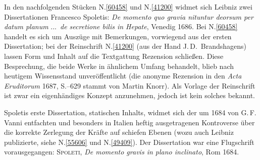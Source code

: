\begin{ledgroup}
\footnotesize
\pstart
\noindent
In den nachfolgenden Stücken N.\;\ref{60458} und N.\;\ref{41200} widmet sich Leibniz zwei Dissertationen Francesco Spoletis:
\cite{02095}\textit{De momento quo gravia nituntur deorsum per datum planum} \lbrack...\rbrack\ \textit{de secretione bilis in Hepate}, Venedig 1686.
Bei N.\;\ref{60458} handelt es sich um Auszüge mit Bemerkungen, vorwiegend aus der ersten Dissertation;
bei der Reinschrift N.\;\ref{41200} (aus der Hand J.\,D.~Brandshagens)
lassen Form und Inhalt auf die Textgattung Rezension schließen.
Diese Besprechung, die beide Werke in ähnlichem Umfang behandelt, blieb nach heutigem Wissensstand unveröffentlicht (die anonyme \cite{02117}Rezension in den \cite{01023}\textit{Acta Eruditorum} 1687, S.--629 stammt von Martin Knorr).
Als Vorlage der Reinschrift ist zwar ein eigenhändiges Konzept anzunehmen, jedoch ist kein solches bekannt.
\pend

\pstart
Spoletis erste Dissertation, statischen Inhalts, widmet sich der
um 1684 von G.\,F. Vanni entfachten
und besonders in Italien heftig ausgetragenen
Kontroverse über die korrekte Zerlegung der Kräfte auf schiefen Ebenen (wozu auch Leibniz publizierte, siehe N.\;\ref{55606} und N.\;\ref{49409}).
Der Dissertation war eine Flugschrift vorausgegangen:
\textsc{Spoleti}, \cite{02096}\textit{De momento gravis in plano inclinato}, Rom 1684.
\pend


\end{ledgroup}
